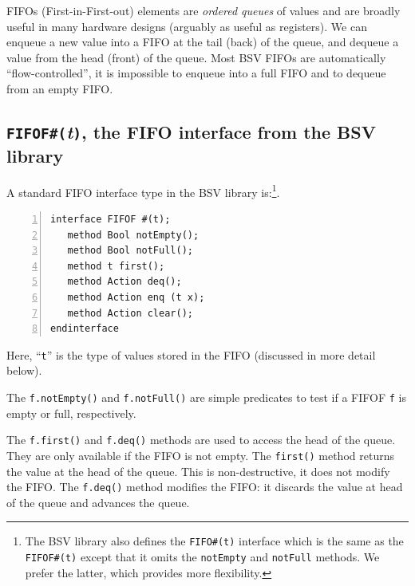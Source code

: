 FIFOs (First-in-First-out) elements are \emph{ordered queues} of
values and are broadly useful in many hardware designs (arguably as
useful as registers).  We can enqueue a new value into a FIFO at the
tail (back) of the queue, and dequeue a value from the head (front) of
the queue.  Most BSV FIFOs are automatically ``flow-controlled'',
{\ie} it is impossible to enqueue into a full FIFO and to dequeue from
an empty FIFO.


\subsection{{\tt FIFOF\#(}\emph{t}{\tt )}, the FIFO interface from the BSV library}

\label{Sec_FIFOF_interface}


A standard FIFO interface type in the BSV library is:\footnote{The BSV
library also defines the {\tt FIFO\#(t)} interface which is the same
as the {\tt FIFOF\#(t)} except that it omits the {\tt notEmpty} and
{\tt notFull} methods.  We prefer the latter, which provides more
flexibility.}.

{\small
\begin{Verbatim}[frame=single, numbers=left]
interface FIFOF #(t);
   method Bool notEmpty();
   method Bool notFull();
   method t first();
   method Action deq();
   method Action enq (t x);
   method Action clear();
endinterface
\end{Verbatim}
}

Here, ``\verb|t|'' is the type of values stored in the FIFO (discussed
in more detail below).

The \verb|f.notEmpty()| and \verb|f.notFull()| are simple predicates
to test if a FIFOF {\tt f} is empty or full, respectively.

The \verb|f.first()| and \verb|f.deq()| methods are used to access the
head of the queue.  They are only available if the FIFO is not empty.
The \verb|first()| method returns the value at the head of the queue.
This is non-destructive, {\ie} it does not modify the FIFO.  The
\verb|f.deq()| method modifies the FIFO: it discards the value at head
of the queue and advances the queue.

